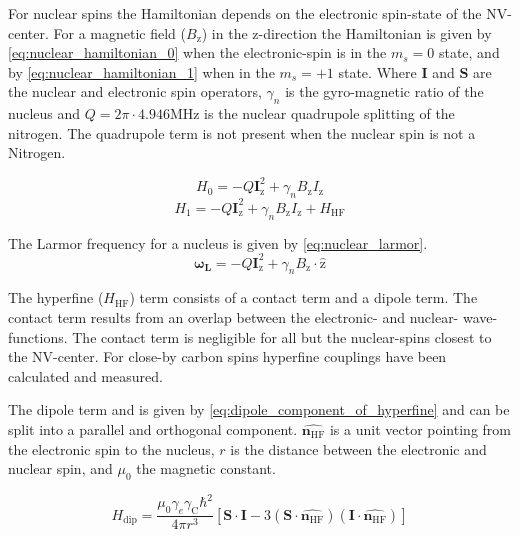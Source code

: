 For nuclear spins the Hamiltonian depends on the electronic spin-state of the NV-center.
For a magnetic field ($B_\mathrm{z}$) in the z-direction the Hamiltonian is given by \cref{eq:nuclear_hamiltonian_0} when the electronic-spin is in the $m_s = 0$ state, and by \cref{eq:nuclear_hamiltonian_1} when in the $m_s = +1$ state\citep{Taminiau2014Universal}.
Where $\bm{I}$ and $\bm{S}$ are the nuclear and electronic spin operators, $\gamma_n$ is the gyro-magnetic ratio of the nucleus and $Q= 2\pi \cdot 4.946 \mathrm{ MHz}$ is the nuclear quadrupole splitting of the nitrogen.
The quadrupole term is not present when the nuclear spin is not a Nitrogen.

\begin{equation}
    \label{eq:nuclear_hamiltonian_0}
    H_0= -Q\bm{I}_{\mathrm{z}}^2+ \gamma_{n} B_\mathrm{z} I_\mathrm{z}
\end{equation}
\begin{equation}
    \label{eq:nuclear_hamiltonian_1}
    H_1 = -Q\bm{I}_{\mathrm{z}}^2+\gamma_{n} B_\mathrm{z} I_\mathrm{z} +H_{\mathrm{HF}}
\end{equation}

The Larmor frequency for a nucleus is given by  \cref{eq:nuclear_larmor}.
\begin{equation}
\label{eq:nuclear_larmor}
\bm{\omega_L} =-Q\bm{I}_{\mathrm{z}}^2+ \gamma_{n}B_\mathrm{z} \cdot\bm{\hat{\mathrm{z}}}
\end{equation}

The hyperfine ($H_{\mathrm{HF}}$) term consists of a contact term and a dipole term.
The contact term results from an overlap between the electronic- and nuclear- wave-functions.
The contact term is negligible for all but the nuclear-spins closest to the NV-center.
For close-by carbon spins hyperfine couplings have been  calculated\citep{Gali2008Ab,Gali2009Identification} and measured\citep{Smeltzer201113}.

The dipole term and is given by \cref{eq:dipole_component_of_hyperfine}\citep{Lange2012Quantum} and can be split into a parallel and orthogonal component.
$\hat{\bm{n_{\mathrm{HF}}}}$ is a unit vector pointing from the electronic spin to the nucleus, $r$ is the distance between the electronic and nuclear spin, and $\mu_0$ the magnetic constant.

\begin{equation}
\label{eq:dipole_component_of_hyperfine}
H_{\mathrm{dip}} = \frac{\mu_0 \gamma_e \gamma_{\mathrm{C}} \hbar^2 }{4 \pi r^3} [ \bm{S \cdot I} - 3 (\bm S \cdot \hat{\bm{n_{\mathrm{HF}}}})(\bm I \cdot \hat{\bm{n_{\mathrm{HF}}}})]
\end{equation}

